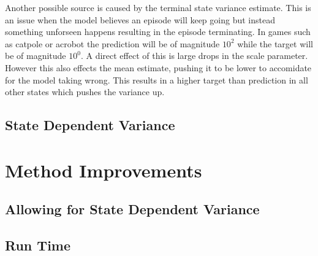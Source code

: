 Another possible source is caused by the terminal state variance estimate. This is an issue when the model believes an episode will keep going but instead something unforseen happens resulting in the episode terminating. In games such as catpole or acrobot the prediction will be of magnitude $10^2$ while the target will be of magnitude $10^0$. A direct effect of this is large drops in the scale parameter. However this also effects the mean estimate, pushing it to be lower to accomidate for the model taking wrong. This results in a higher target than prediction in all other states which pushes the variance up.


\subsection{State Dependent Variance}



\section{Method Improvements}

\subsection{Allowing for State Dependent Variance}

\subsection{Run Time}

\cleardoublepage